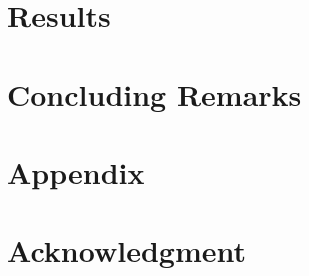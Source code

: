 \documentclass[sigconf,table]{acmart}
\begin{document}
\section{Results}
\label{sec:results}
%

%
%
%


    

\section{Concluding Remarks}
\label{sec:concl}



\section{Appendix}

  
\section*{Acknowledgment}






\end{document}
